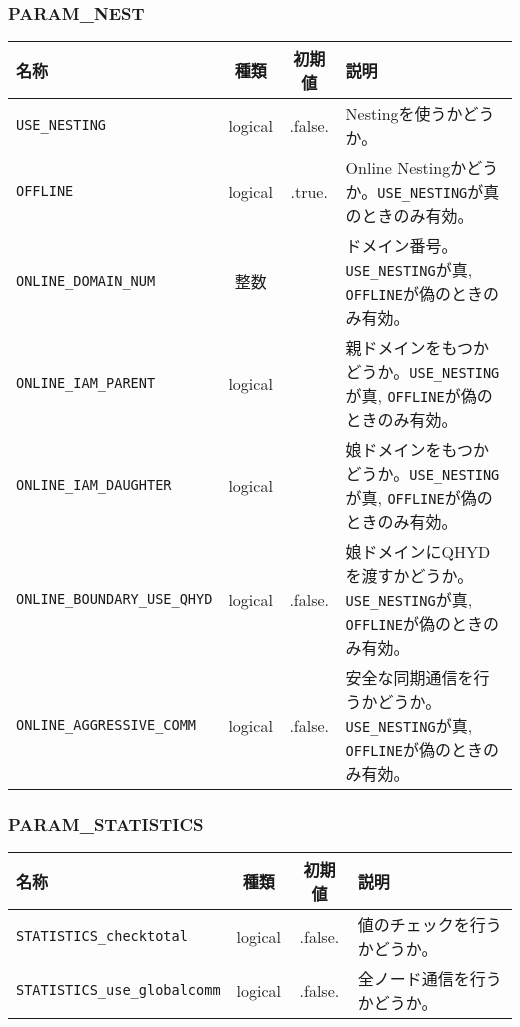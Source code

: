 \subsubsection{PARAM\_NEST}
\begin{tabularx}{150mm}{|l|c|c|X|} \hline
 \rowcolor[gray]{0.9} 名称 & 種類 & 初期値 & 説明 \\ \hline
 \verb|USE_NESTING| & logical & .false. & Nestingを使うかどうか。 \\ \hline
 \verb|OFFLINE| & logical & .true. & Online Nestingかどうか。\verb|USE_NESTING|が真のときのみ有効。 \\ \hline
 \verb|ONLINE_DOMAIN_NUM| & 整数 &  & ドメイン番号。\verb|USE_NESTING|が真, \verb|OFFLINE|が偽のときのみ有効。 \\ \hline
 \verb|ONLINE_IAM_PARENT| & logical &  & 親ドメインをもつかどうか。\verb|USE_NESTING|が真, \verb|OFFLINE|が偽のときのみ有効。 \\ \hline
 \verb|ONLINE_IAM_DAUGHTER| & logical &  & 娘ドメインをもつかどうか。\verb|USE_NESTING|が真, \verb|OFFLINE|が偽のときのみ有効。 \\ \hline
 \verb|ONLINE_BOUNDARY_USE_QHYD| & logical & .false. & 娘ドメインにQHYDを渡すかどうか。\verb|USE_NESTING|が真, \verb|OFFLINE|が偽のときのみ有効。 \\ \hline
 \verb|ONLINE_AGGRESSIVE_COMM| & logical & .false. & 安全な同期通信を行うかどうか。\verb|USE_NESTING|が真, \verb|OFFLINE|が偽のときのみ有効。 \\ \hline
\end{tabularx}


\subsubsection{PARAM\_STATISTICS}
\begin{tabularx}{150mm}{|l|c|c|X|} \hline
 \rowcolor[gray]{0.9} 名称 & 種類 & 初期値 & 説明 \\ \hline
 \verb|STATISTICS_checktotal| & logical & .false. & 値のチェックを行うかどうか。 \\ \hline
 \verb|STATISTICS_use_globalcomm| & logical & .false. & 全ノード通信を行うかどうか。 \\ \hline
\end{tabularx}


